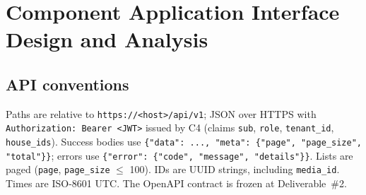 \section{Component Application Interface Design and Analysis}

\subsection{API conventions}
Paths are relative to \texttt{https://<host>/api/v1}; JSON over HTTPS with \texttt{Authorization: Bearer <JWT>}
issued by C4 (claims \texttt{sub}, \texttt{role}, \texttt{tenant\_id}, \texttt{house\_ids}). Success bodies use
\texttt{\{"data": ..., "meta": \{"page", "page\_size", "total"\}\}}; errors use
\texttt{\{"error": \{"code", "message", "details"\}\}}. Lists are paged (\texttt{page}, \texttt{page\_size} $\le$ 100).
IDs are UUID strings, including \texttt{media\_id}. Times are ISO-8601 UTC. The OpenAPI contract is frozen at Deliverable~\#2.

